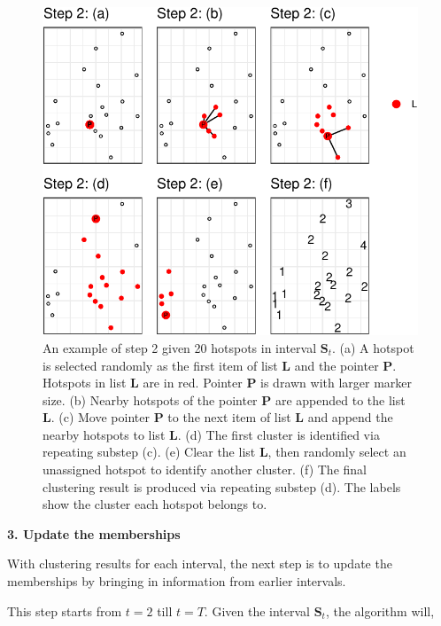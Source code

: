 \begin{Schunk}
\begin{figure}

{\centering \includegraphics[width=0.8\linewidth]{clustering_paper_files/figure-latex/step2figs-1} 

}

\caption{An example of step 2 given 20 hotspots in interval $\boldsymbol{S}_t$. (a) A hotspot is selected randomly as the first item of list $\boldsymbol{L}$ and the pointer $\boldsymbol{P}$. Hotspots in list $\boldsymbol{L}$ are in red. Pointer $\boldsymbol{P}$ is drawn with larger marker size. (b) Nearby hotspots of the pointer $\boldsymbol{P}$ are appended to the list $\boldsymbol{L}$. (c) Move pointer $\boldsymbol{P}$ to the next item of list $\boldsymbol{L}$ and append the nearby hotspots to list $\boldsymbol{L}$. (d) The first cluster is identified via repeating substep (c). (e) Clear the list $\boldsymbol{L}$, then randomly select an unassigned hotspot to identify another cluster. (f) The final clustering result is produced via repeating substep (d). The labels show the cluster each hotspot belongs to.}\label{fig:step2figs}
\end{figure}
\end{Schunk}

\textbf{3. Update the memberships}

With clustering results for each interval, the next step is to update
the memberships by bringing in information from earlier intervals.

This step starts from \(t=2\) till \(t=T\). Given the interval
\(\boldsymbol{S}_t\), the algorithm will,

